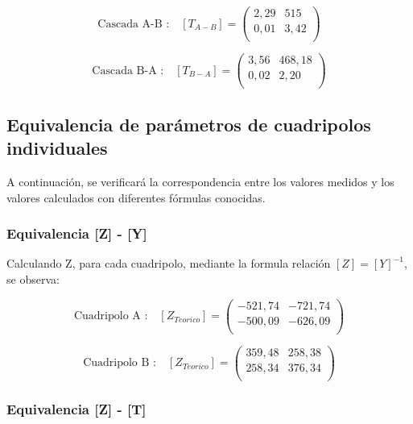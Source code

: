 \documentclass[a4paper]{article}
\begin{document}
\begin{equation}
\text{Cascada A-B :}\quad [T_{A-B}] =
\left( \begin{array}{cc}
	2,29 & 515\\
	0,01 & 3,42\\
\end{array} \right)
\end{equation}

\begin{equation}
\text{Cascada B-A :}\quad [T_{B-A}] =
\left( \begin{array}{cc}
	3,56 & 468,18\\
	0,02 & 2,20\\
\end{array} \right)
\end{equation}

\subsection*{Equivalencia de parámetros de cuadripolos individuales}

A continuación, se verificará la correspondencia entre los valores medidos y los valores calculados con diferentes fórmulas conocidas.

\subsubsection*{Equivalencia [Z] - [Y]}

Calculando Z, para cada cuadripolo, mediante la formula relación $[Z]=[Y]^{-1}$, se observa:

\begin{equation}
\text{Cuadripolo A :}\quad [Z_{Teorico}] =
\left( \begin{array}{cc}
	-521,74 & -721,74\\
	-500,09 & -626,09\\
\end{array} \right)
\end{equation}

\begin{equation}
\text{Cuadripolo B :}\quad [Z_{Teorico}] =
\left( \begin{array}{cc}
	359,48 & 258,38\\
	 258,34 & 376,34\\
\end{array} \right)
\end{equation}

\subsubsection*{Equivalencia [Z] - [T]}
\end{document}
